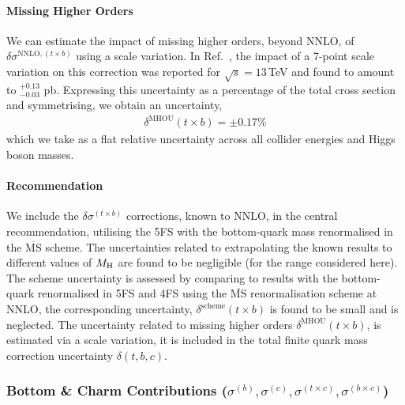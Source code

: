 
\paragraph{Missing Higher Orders}
We can estimate the impact of missing higher orders, beyond NNLO, of $\delta \sigma^{\mathrm{NNLO}, (t \times b)}$ using a scale variation.
In Ref.~\cite{Czakon:2024ywb}, the impact of a 7-point scale variation on this correction was reported for $\sqrt{s}=13$\,TeV and found to amount to $^{+0.13}_{-0.03}$ pb.
Expressing this uncertainty as a percentage of the total cross section and symmetrising, we obtain an uncertainty,
\begin{align}
\delta^{\mathrm{MHOU}}(t \times b) = \pm 0.17 \%
\end{align}
which we take as a flat relative uncertainty across all collider energies and Higgs boson masses.

\paragraph{Recommendation}
We include the $\delta \sigma^{(t\times b)}$ corrections, known to NNLO, in the central recommendation, utilising the 5FS with the bottom-quark mass renormalised in the $\overline{\mathrm{MS}}$ scheme.
The uncertainties related to extrapolating the known results to different values of $M_\mathrm{H}$ are found to be negligible (for the range considered here).
The scheme uncertainty is assessed by comparing to results with the bottom-quark renormalised in 5FS and 4FS using the $\overline{\mathrm{MS}}$ renormalisation scheme at NNLO, the corresponding uncertainty, $\delta^\mathrm{scheme}(t \times b)$ is found to be small and is neglected.  
The uncertainty related to missing higher orders $\delta^{\mathrm{MHOU}}(t \times b)$, is estimated via a scale variation, it is included in the total finite quark mass correction uncertainty $\delta(t,b,c)$.


\subsubsection{Bottom \& Charm Contributions ($\sigma^{(b)},\sigma^{(c)},\sigma^{(t \times c)},\sigma^{(b \times c)}$)}
\label{sec:ggf_mbmc}

